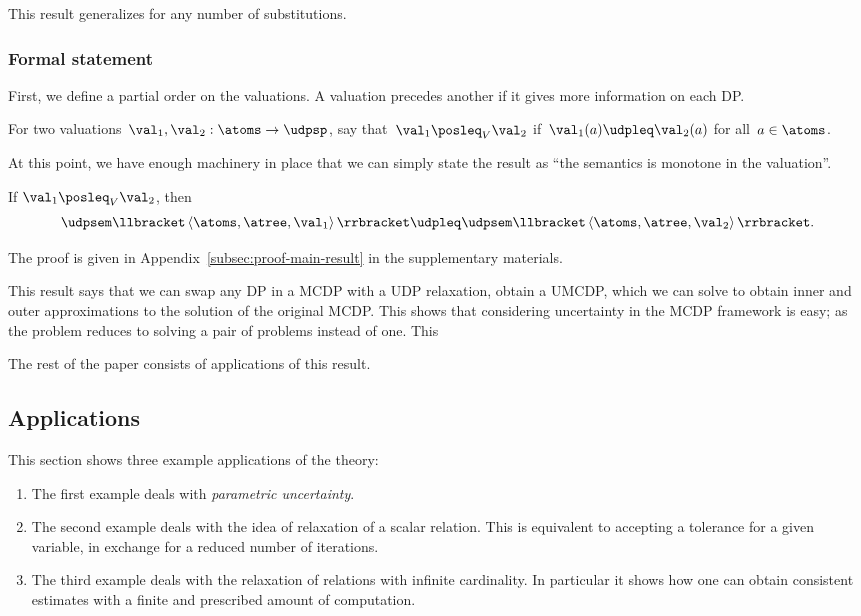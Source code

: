 This result generalizes for any number of substitutions.

\subsubsection*{Formal statement}

First, we define a partial order on the valuations. A valuation precedes
another if it gives more information on each DP.
\begin{definition}
\label{def:For-two-valuations,}For two valuations~$\val_{1},\val_{2}:\atoms\rightarrow\udpsp$,
say that~$\val_{1}\posleq_{V}\val_{2}$ if~$\val_{1}(a)\udpleq\val_{2}(a)$
for all~$a\in\atoms$.
\end{definition}
At this point, we have enough machinery in place that we can simply
state the result as ``the semantics is monotone in the valuation''.
\begin{theorem}
\label{thm:udpsem-monotone}If $\val_{1}\posleq_{V}\val_{2}$, then
\[
\udpsem\llbracket\left\langle \atoms,\atree,\val_{1}\right\rangle \rrbracket\udpleq\udpsem\llbracket\left\langle \atoms,\atree,\val_{2}\right\rangle \rrbracket.
\]
\end{theorem}
The proof is given in Appendix~\cref{subsec:proof-main-result}
in the supplementary materials.

This result says that we can swap any DP in a MCDP with a UDP relaxation,
obtain a UMCDP, which we can solve to obtain inner and outer approximations
to the solution of the original MCDP. This shows that considering
uncertainty in the MCDP framework is easy; as the problem reduces
to solving a pair of problems instead of one. This

The rest of the paper consists of applications of this result.

\subsection{Applications\label{sec:Applications}}

This section shows three example applications of the theory:
\begin{enumerate}
\item The first example deals with \emph{parametric uncertainty}.
\item The second example deals with the idea of relaxation of a scalar relation.
This is equivalent to accepting a tolerance for a given variable,
in exchange for a reduced number of iterations.
\item The third example deals with the relaxation of relations with infinite
cardinality. In particular it shows how one can obtain consistent
estimates with a finite and prescribed amount of computation.
\end{enumerate}

